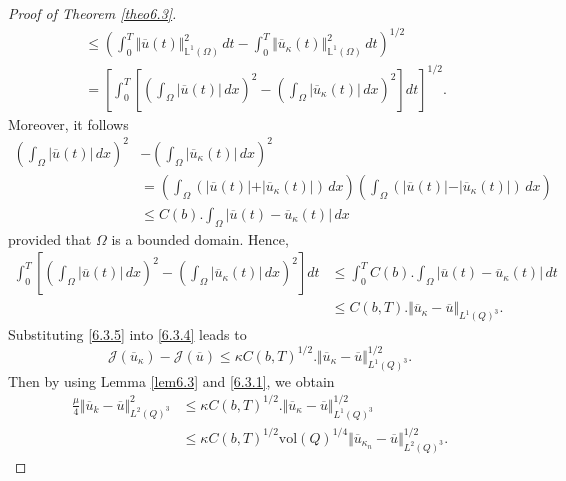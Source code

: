 \documentclass[reqno]{amsart}
\begin{document}
\begin{proof}[Proof of Theorem \ref{theo6.3}]
\begin{align*}
			&\leq \left( \int_0^T \Vert \overline{u}(t) \Vert_{\mathbb{L}^1(\Omega)}^2 \, dt - \int_0^T \Vert \overline{u}_{\kappa}(t) \Vert_{\mathbb{L}^1(\Omega)}^2 \, dt \right)^{1/2} \\
			&= \left[\int_0^T  \left[  \left( \int_{\Omega} |\overline{u}(t)| \, dx \right)^2 - \left(\int_{\Omega} \vert \overline{u}_{\kappa}(t) \vert \, dx \right)^2\right]dt \right]^{1/2}.
		\end{align*}
		Moreover, it follows
		\begin{align*}
			\left( \int_{\Omega} |\overline{u}(t)| \, dx \right)^2 &- \left(\int_{\Omega} \vert \overline{u}_{\kappa}(t) \vert \, dx \right)^2 \\
			&= \left( \int_{\Omega} (\vert \overline{u}(t) \vert + \vert \overline{u}_{\kappa}(t) \vert) \, dx \right) \left( \int_{\Omega} (\vert \overline{u}(t) \vert - \vert \overline{u}_{\kappa}(t) \vert) \, dx \right) \\
			&\leq C(b). \int_{\Omega} \vert \overline{u}(t) - \overline{u}_{\kappa}(t)\vert \, dx
		\end{align*}
		provided that $\Omega$ is a bounded domain.
		Hence, 
		\begin{equation} \label{6.3.5}
			\begin{aligned}
				\int_0^T  \left[  \left( \int_{\Omega} |\overline{u}(t)| \, dx \right)^2 - \left(\int_{\Omega} \vert \overline{u}_{\kappa}(t) \vert \, dx \right)^2\right]dt &\le \int_0^T C(b). \int_{\Omega} \vert \overline{u}(t) - \overline{u}_{\kappa}(t)\vert \, dt \\
				&\le C(b,T).\Vert \overline{u}_{\kappa} - \overline{u}\Vert_{L^1(Q)^3}. 
			\end{aligned}
		\end{equation}
		Substituting \eqref{6.3.5} into \eqref{6.3.4} leads to
		\begin{equation}
			\mathcal{J}(\overline{u}_{\kappa}) - \mathcal{J}(\overline{u}) \leq \kappa C(b,T)^{1/2}.\Vert \overline{u}_{\kappa} - \overline{u}\Vert_{L^1(Q)^3}^{1/2}.
		\end{equation}
		Then by using Lemma \ref{lem6.3} and \eqref{6.3.1}, we obtain
		\begin{align*}
			\frac{\mu}{4} \Vert \overline{u}_k - \overline{u} \Vert_{L^2(Q)^3}^2 &\leq \kappa C(b,T)^{1/2}.\Vert \overline{u}_{\kappa} - \overline{u}\Vert_{L^1(Q)^3}^{1/2} \\
			&\leq \kappa C(b, T)^{1/2} \text{vol}(Q)^{1/4} \Vert \overline{u}_{\kappa_n}- \overline{u} \Vert_{L^2(Q)^3}^{1/2}.
		\end{align*}

\end{proof}
\end{document}
